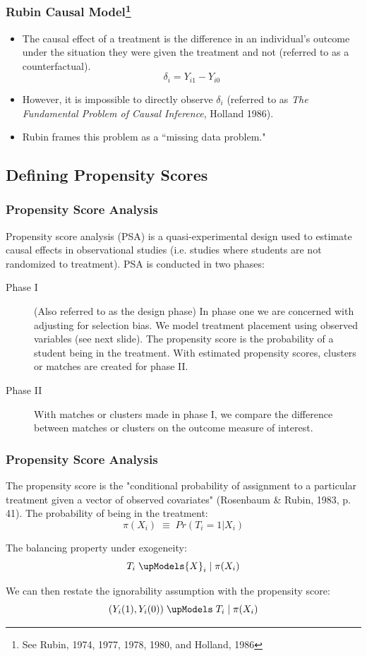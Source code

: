 \documentclass[10pt,slidestop,mathserif,c]{beamer}
\begin{document}
\begin{frame}
    \frametitle{Rubin Causal Model\footnote{See Rubin, 1974, 1977, 1978, 1980, and Holland, 1986}}
    \begin{itemize}
        \item The causal effect of a treatment is the difference in an individual's outcome under the situation they were given the treatment and not (referred to as a counterfactual).
        $${\delta}_{i} ={ Y }_{ i1 }-{ Y }_{ i0 }$$
        \item However, it is impossible to directly observe ${\delta}_{i}$ (referred to as \textit{The Fundamental Problem of Causal Inference}, Holland 1986).
        \item Rubin frames this problem as a ``missing data problem."
    \end{itemize}
\end{frame}



\subsection{Defining Propensity Scores}

\begin{frame}
    \frametitle{Propensity Score Analysis}
    Propensity score analysis (PSA) is a quasi-experimental design used to estimate causal effects in observational studies (i.e. studies where students are not randomized to treatment). PSA is conducted in two phases:
    \begin{description}
        \item[Phase I] (Also referred to as the design phase) In phase one we are concerned with adjusting for selection bias. We model treatment placement using observed variables (see next slide). The propensity score is the probability of a student being in the treatment. With estimated propensity scores, clusters or matches are created for phase II.
        \item[Phase II] With matches or clusters made in phase I, we compare the difference between matches or clusters on the outcome measure of interest.
    \end{description}
\end{frame}


\begin{frame}
    \frametitle{Propensity Score Analysis}
    The propensity score is the "conditional probability of assignment to a particular treatment given a vector of observed covariates" (Rosenbaum \& Rubin, 1983, p. 41). The probability of being in the treatment:
    $$\pi ({ X }_{ i }) \; \equiv \; Pr({ T }_{ i }=1|{ X }_{ i })$$
    
    The balancing property under exogeneity:
    $${ T }_{ i } \; \upModels { X }_{ i } \;| \; \pi ({ X }_{ i })$$
    
    We can then restate the ignorability assumption with the propensity score: 
    $$({ Y }_{ i }(1),{ Y }_{ i }(0)) \; \upModels \; { T }_{ i } \; | \; \pi({ X }_{ i })$$
\end{frame}
    
\end{document}
